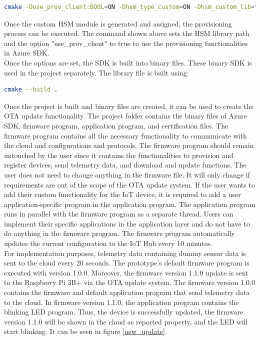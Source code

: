 \documentclass[12pt,a4paper]{article}
\begin{document}
{\begin{lstlisting}[language=bash]
cmake -Duse_prov_client:BOOL=ON -Dhsm_type_custom=ON -Dhsm_custom_lib="Path to the custom lib file" .
\end{lstlisting}

Once the custom HSM module is generated and assigned, the provisioning process can be executed. The command shown above sets the HSM library path and the option "use\_prov\_client" to true to use the provisioning functionalities in Azure SDK. \\

Once the options are set, the SDK is built into binary files. These binary SDK is used in the project separately. The library file is built using:

\begin{lstlisting}[language=bash]
cmake --build .
\end{lstlisting}

Once the project is built and binary files are created, it can be used to create the OTA update functionality. The project folder contains the binary files of Azure SDK, firmware program, application program, and certification files. The firmware program contains all the necessary functionality to communicate with the cloud and configurations and protocols. The firmware program should remain untouched by the user since it contains the functionalities to provision and register devices, send telemetry data, and download and update functions. The user does not need to change anything in the firmware file. It will only change if requirements are out of the scope of the OTA update system. If the user wants to add their custom functionality for the IoT device, it is required to add a user application-specific program in the application program. The application program runs in parallel with the firmware program as a separate thread. Users can implement their specific applications in the application layer and do not have to do anything in the firmware program. The firmware program automatically updates the current configuration to the IoT Hub every 10 minutes. \\

For implementation purposes, telemetry data containing dummy sensor data is sent to the cloud every 20 seconds. The prototype's default firmware program is executed with version 1.0.0. Moreover, the firmware version 1.1.0 update is sent to the Raspberry Pi 3B+ via the OTA update system. The firmware version 1.0.0 contains the firmware and default application program that send telemetry data to the cloud. In firmware version 1.1.0, the application program contains the blinking LED program. Thus, the device is successfully updated, the firmware version 1.1.0 will be shown in the cloud as reported property, and the LED will start blinking. It can be seen in figure \ref{new_update}.

}
\end{document}
